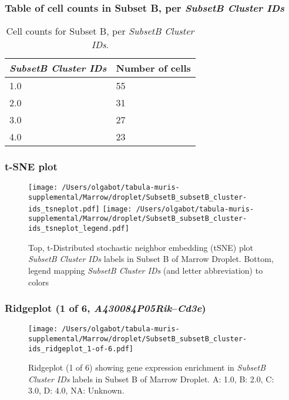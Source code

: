 \subsubsection{Table of cell counts in Subset B, per \emph{SubsetB Cluster IDs}}\begin{table}[h]
\centering
\label{my-label}
\begin{tabular}{@{}ll@{}}
\toprule

\emph{SubsetB Cluster IDs}& Number of cells \\ \midrule
1.0 & 55 \\

2.0 & 31 \\

3.0 & 27 \\

4.0 & 23 \\
\bottomrule
\end{tabular}
\caption{Cell counts for Subset B, per \emph{SubsetB Cluster IDs}.}
\end{table}

\clearpage
\subsubsection{t-SNE plot}
\begin{figure}[h]
\centering
\texttt{[image: /Users/olgabot/tabula-muris-supplemental/Marrow/droplet/SubsetB\_subsetB\_cluster-ids\_tsneplot.pdf]}
\texttt{[image: /Users/olgabot/tabula-muris-supplemental/Marrow/droplet/SubsetB\_subsetB\_cluster-ids\_tsneplot\_legend.pdf]}
\caption{Top, t-Distributed stochastic neighbor embedding (tSNE) plot  \emph{SubsetB Cluster IDs} labels in Subset B of Marrow Droplet. Bottom, legend mapping \emph{SubsetB Cluster IDs} (and letter abbreviation) to colors}
\end{figure}


\clearpage

\subsubsection{Ridgeplot (1 of 6, \emph{A430084P05Rik}--\emph{Cd3e})}
\begin{figure}[h]
\centering
\texttt{[image: /Users/olgabot/tabula-muris-supplemental/Marrow/droplet/SubsetB\_subsetB\_cluster-ids\_ridgeplot\_1-of-6.pdf]}

\caption{ Ridgeplot (1 of 6)  showing gene expression enrichment in \emph{SubsetB Cluster IDs} labels in Subset B of Marrow Droplet. A: 1.0, B: 2.0, C: 3.0, D: 4.0, NA: Unknown.}
\end{figure}


